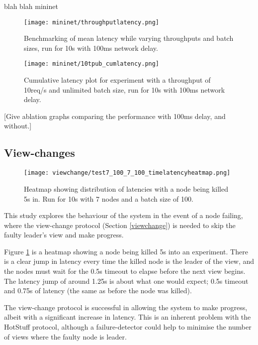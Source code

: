 blah blah mininet \cite{mininet,lantzNetworkLaptopRapid2010}
\begin{figure}[h!]
\centering
\texttt{[image: mininet/throughputlatency.png]}
\caption{Benchmarking of mean latency while varying throughputs and batch sizes, run for 10s with 100ms network delay.}
\end{figure}

\begin{figure}[h!]
\centering
\texttt{[image: mininet/10tpub\_cumlatency.png]}
\caption{Cumulative latency plot for experiment with a throughput of 10req/s and unlimited batch size, run for 10s with 100ms network delay.}
\end{figure}

[Give ablation graphs comparing the performance with 100ms delay, and without.]

\subsection{View-changes} \label{viewchangeeval}

\begin{figure}[h!]
\centering
\texttt{[image: viewchange/test7\_100\_7\_100\_timelatencyheatmap.png]}
\caption{Heatmap showing distribution of latencies with a node being killed 5s in. Run for 10s with 7 nodes and a batch size of 100.}
\label{viewchangeheatmap}
\end{figure}

This study explores the behaviour of the system in the event of a node failing, where the view-change protocol (Section \ref{viewchange}) is needed to skip the faulty leader's view and make progress.

Figure \ref{viewchangeheatmap} is a heatmap showing a node being killed 5s into an experiment. There is a clear jump in latency every time the killed node is the leader of the view, and the nodes must wait for the 0.5s timeout to elapse before the next view begins. The latency jump of around 1.25s is about what one would expect; 0.5s timeout and 0.75s of latency (the same as before the node was killed).

The view-change protocol is successful in allowing the system to make progress, albeit with a significant increase in latency. This is an inherent problem with the HotStuff protocol, although a failure-detector could help to minimise the number of views where the faulty node is leader.


